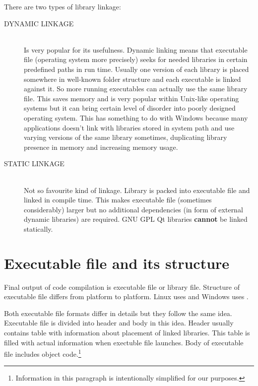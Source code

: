 \begin{fdocextra}
There are two types of library linkage:
\begin{description}
\item[DYNAMIC LINKAGE] \hfill \\
Is very popular for its usefulness. Dynamic linking means that executable file (operating system more precisely) seeks for needed libraries in certain predefined paths in run time. Usually one version of each library is placed somewhere in well-known folder structure and each executable is linked against it. So more running executables can actually use the same library file. This saves memory and is very popular within Unix-like operating systems but it can bring certain level of disorder into poorly designed operating system. This has something to do with Windows because many applications doesn't link with libraries stored in system path and use varying versions of the same library sometimes, duplicating library presence in memory and increasing memory usage.
\item[STATIC LINKAGE] \hfill \\
Not so favourite kind of linkage. Library is packed into executable file and linked in compile time. This makes executable file (sometimes considerably) larger but no additional dependencies (in form of external dynamic libraries) are required. GNU GPL Qt libraries \textbf{cannot} be linked statically.
\end{description}
\end{fdocextra}

\section{Executable file and its structure}
Final output of \cpp{} code compilation is executable file or library file. Structure of executable file differs from platform to platform. Linux uses  and Windows uses .

Both executable file formats differ in details but they follow the same idea. Executable file is divided into header and body in this idea. Header usually contains table with information about placement of linked libraries. This table is filled with actual information when exectuble file launches. Body of executable file includes object code.\footnote{Information in this paragraph is intentionally simplified for our purposes.}

